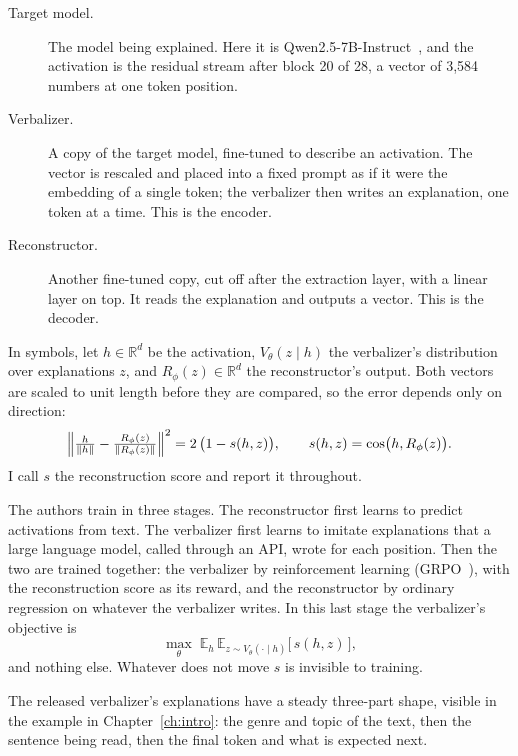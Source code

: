 \begin{description}
\item[Target model.] The model being explained. Here it is Qwen2.5-7B-Instruct~\cite{qwen25}, and the
activation is the residual stream after block 20 of 28, a vector of 3{,}584 numbers at one token position.
\item[Verbalizer.] A copy of the target model, fine-tuned to describe an activation. The vector is rescaled
and placed into a fixed prompt as if it were the embedding of a single token; the verbalizer then writes an
explanation, one token at a time. This is the encoder.
\item[Reconstructor.] Another fine-tuned copy, cut off after the extraction layer, with a linear layer on
top. It reads the explanation and outputs a vector. This is the decoder.
\end{description}

In symbols, let $h \in \mathbb{R}^d$ be the activation, $V_\theta(z \mid h)$ the verbalizer's distribution over
explanations $z$, and $R_\phi(z) \in \mathbb{R}^d$ the reconstructor's output. Both vectors are scaled to unit
length before they are compared, so the error depends only on direction:
\begin{equation}
\Bigl\| \tfrac{h}{\|h\|} - \tfrac{R_\phi(z)}{\|R_\phi(z)\|} \Bigr\|^2 = 2\,\bigl(1 - s(h,z)\bigr),
\qquad s(h,z) = \cos\bigl(h, R_\phi(z)\bigr).
\label{eq:score}
\end{equation}
I call $s$ the reconstruction score and report it throughout.

The authors train in three stages. The reconstructor first learns to predict activations from text. The
verbalizer first learns to imitate explanations that a large language model, called through an API, wrote
for each position. Then the two are trained together: the verbalizer by reinforcement learning
(GRPO~\cite{shao2024deepseekmath}), with the reconstruction score as its reward, and the reconstructor by
ordinary regression on whatever the verbalizer writes. In this last stage the verbalizer's objective is
\begin{equation}
\max_\theta \; \mathbb{E}_{h}\, \mathbb{E}_{z \sim V_\theta(\cdot \mid h)} \bigl[\, s(h,z) \,\bigr],
\label{eq:objective}
\end{equation}
and nothing else. Whatever does not move $s$ is invisible to training.

The released verbalizer's explanations have a steady three-part shape, visible in the example in
Chapter~\ref{ch:intro}: the genre and topic of the text, then the sentence being read, then the final token
and what is expected next.

